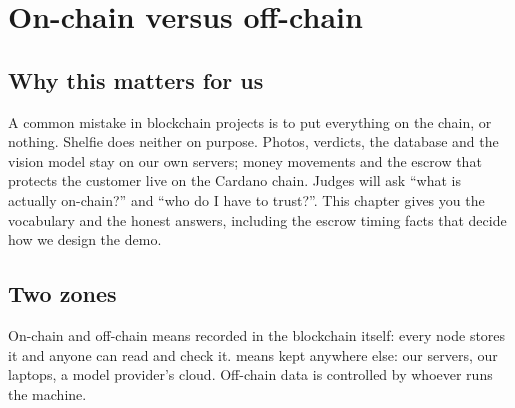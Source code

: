 \chapter{On-chain versus off-chain}

\section*{Why this matters for us}
A common mistake in blockchain projects is to put everything on the chain, or nothing. Shelfie does neither on purpose. Photos, verdicts, the database and the vision model stay on our own servers; money movements and the escrow that protects the customer live on the Cardano chain. Judges will ask ``what is actually on-chain?'' and ``who do I have to trust?''. This chapter gives you the vocabulary and the honest answers, including the escrow timing facts that decide how we design the demo.

\section{Two zones}
\begin{conceptbox}{On-chain and off-chain}
 means recorded in the blockchain itself: every node stores it and anyone can read and check it.  means kept anywhere else: our servers, our laptops, a model provider's cloud. Off-chain data is controlled by whoever runs the machine.
\end{conceptbox}

